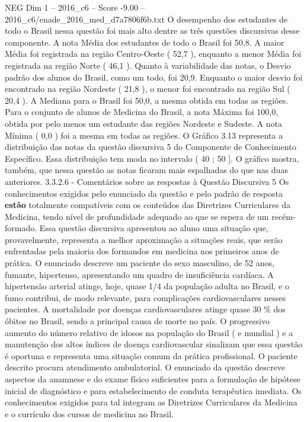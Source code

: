 \begin{textsample}{NEG Dim 1 – 2016\_c6 – Score -9.00 – 2016\_c6/enade\_2016\_med\_d7a7806f6b.txt}
O desempenho dos estudantes de todo o Brasil nessa questão foi mais alto dentre as três questões discursivas desse componente.
A nota Média dos estudantes de todo o Brasil foi 50,8.
A maior Média foi registrada na região Centro-Oeste ( 52,7 ), enquanto a menor Média foi registrada na região Norte ( 46,1 ).
Quanto à variabilidade das notas, o Desvio padrão dos alunos do Brasil, como um todo, foi 20,9.
Enquanto o maior desvio foi encontrado na região Nordeste ( 21,8 ), o menor foi encontrado na região Sul ( 20,4 ).
A Mediana para o Brasil foi 50,0, a mesma obtida em todas as regiões.
Para o conjunto de alunos de Medicina do Brasil, a nota Máxima foi 100,0, obtida por pelo menos um estudante das regiões Nordeste e Sudeste.
A nota Mínima ( 0,0 ) foi a mesma em todas as regiões.
O Gráfico 3.13 representa a distribuição das notas da questão discursiva 5 do Componente de Conhecimento Específico.
Essa distribuição tem moda no intervalo ( 40 ; 50 ].
O gráfico mostra, também, que nessa questão as notas ficaram mais espalhadas do que nas duas anteriores. 3.3.2.6 - Comentários sobre as respostas à Questão Discursiva 5 Os conhecimentos exigidos pelo enunciado da questão e pelo padrão de resposta \textbf{estão} totalmente compatíveis com os conteúdos das Diretrizes Curriculares da Medicina, tendo nível de profundidade adequado ao que se espera de um recém-formado.
Essa questão discursiva apresentou ao aluno uma situação que, provavelmente, representa a melhor aproximação a situações reais, que serão enfrentadas pela maioria dos formandos em medicina nos primeiros anos de prática.
O enunciado descreve um paciente do sexo masculino, de 52 anos, fumante, hipertenso, apresentando um quadro de insuficiência cardíaca.
A hipertensão arterial atinge, hoje, quase 1/4 da população adulta no Brasil, e o fumo contribui, de modo relevante, para complicações cardiovasculares nesses pacientes.
A mortalidade por doenças cardiovasculares atinge quase 30 \% dos óbitos no Brasil, sendo a principal causa de morte no país.
O progressivo aumento do número relativo de idosos na população do Brasil ( e mundial ) e a manutenção dos altos índices de doença cardiovascular sinalizam que essa questão é oportuna e representa uma situação comum da prática profissional.
O paciente descrito procura atendimento ambulatorial.
O enunciado da questão descreve aspectos da anamnese e do exame físico suficientes para a formulação de hipótese inicial de diagnóstico e para estabelecimento de conduta terapêutica imediata.
Os conhecimentos exigidos para tal integram as Diretrizes Curriculares da Medicina e o currículo dos cursos de medicina no Brasil.

\end{textsample}

